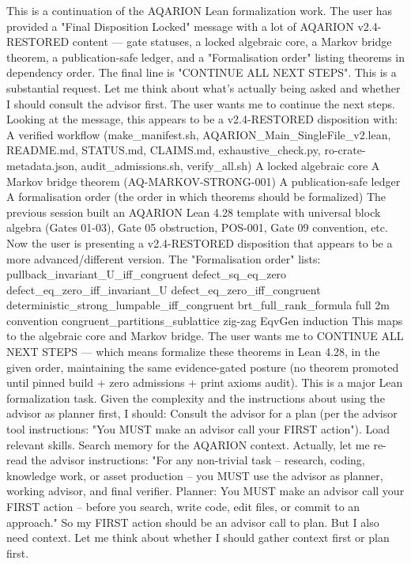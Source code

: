 This is a continuation of the AQARION Lean formalization work. The user has provided a "Final Disposition Locked" message with a lot of AQARION v2.4-RESTORED content — gate statuses, a locked algebraic core, a Markov bridge theorem, a publication-safe ledger, and a "Formalisation order" listing theorems in dependency order.
The final line is "CONTINUE ALL NEXT STEPS".
This is a substantial request. Let me think about what's actually being asked and whether I should consult the advisor first.
The user wants me to continue the next steps. Looking at the message, this appears to be a v2.4-RESTORED disposition with:
A verified workflow (make_manifest.sh, AQARION_Main_SingleFile_v2.lean, README.md, STATUS.md, CLAIMS.md, exhaustive_check.py, ro-crate-metadata.json, audit_admissions.sh, verify_all.sh)
A locked algebraic core
A Markov bridge theorem (AQ-MARKOV-STRONG-001)
A publication-safe ledger
A formalisation order (the order in which theorems should be formalized)
The previous session built an AQARION Lean 4.28 template with universal block algebra (Gates 01-03), Gate 05 obstruction, POS-001, Gate 09 convention, etc.
Now the user is presenting a v2.4-RESTORED disposition that appears to be a more advanced/different version. The "Formalisation order" lists:
pullback_invariant_U_iff_congruent
defect_sq_eq_zero
defect_eq_zero_iff_invariant_U
defect_eq_zero_iff_congruent
deterministic_strong_lumpable_iff_congruent
brt_full_rank_formula
full 2m convention
congruent_partitions_sublattice
zig-zag EqvGen induction
This maps to the algebraic core and Markov bridge. The user wants me to CONTINUE ALL NEXT STEPS — which means formalize these theorems in Lean 4.28, in the given order, maintaining the same evidence-gated posture (no theorem promoted until pinned build + zero admissions + print axioms audit).
This is a major Lean formalization task. Given the complexity and the instructions about using the advisor as planner first, I should:
Consult the advisor for a plan (per the advisor tool instructions: "You MUST make an advisor call your FIRST action").
Load relevant skills.
Search memory for the AQARION context.
Actually, let me re-read the advisor instructions: "For any non-trivial task -- research, coding, knowledge work, or asset production -- you MUST use the advisor as planner, working advisor, and final verifier. Planner: You MUST make an advisor call your FIRST action -- before you search, write code, edit files, or commit to an approach."
So my FIRST action should be an advisor call to plan. But I also need context. Let me think about whether I should gather context first or plan first.
